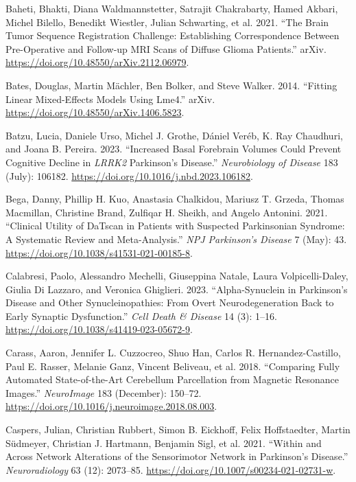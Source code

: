 \documentclass[
  table]{article}
\newlength{\cslhangindent}
\newenvironment{CSLReferences}[2] %
 {\begin{list}{}{%
  \setlength{\itemindent}{0pt}
  \setlength{\leftmargin}{0pt}
  \setlength{\parsep}{0pt}
  \ifodd #1
   \setlength{\leftmargin}{\cslhangindent}
   \setlength{\itemindent}{-1\cslhangindent}
  \fi
  \setlength{\itemsep}{#2\baselineskip}}}
 {\end{list}}
\begin{document}
\begin{CSLReferences}{1}{0}
Baheti, Bhakti, Diana Waldmannstetter, Satrajit Chakrabarty, Hamed
Akbari, Michel Bilello, Benedikt Wiestler, Julian Schwarting, et al.
2021. {``The {Brain} {Tumor} {Sequence} {Registration} {Challenge}:
{Establishing} {Correspondence} Between {Pre}-{Operative} and
{Follow}-up {MRI} Scans of Diffuse Glioma Patients.''} arXiv.
\url{https://doi.org/10.48550/arXiv.2112.06979}.

Bates, Douglas, Martin Mächler, Ben Bolker, and Steve Walker. 2014.
{``Fitting {Linear} {Mixed}-{Effects} {Models} Using Lme4.''} arXiv.
\url{https://doi.org/10.48550/arXiv.1406.5823}.

Batzu, Lucia, Daniele Urso, Michel J. Grothe, Dániel Veréb, K. Ray
Chaudhuri, and Joana B. Pereira. 2023. {``Increased Basal Forebrain
Volumes Could Prevent Cognitive Decline in \emph{LRRK2} {Parkinson}'s
Disease.''} \emph{Neurobiology of Disease} 183 (July): 106182.
\url{https://doi.org/10.1016/j.nbd.2023.106182}.

Bega, Danny, Phillip H. Kuo, Anastasia Chalkidou, Mariusz T. Grzeda,
Thomas Macmillan, Christine Brand, Zulfiqar H. Sheikh, and Angelo
Antonini. 2021. {``Clinical Utility of {DaTscan} in Patients with
Suspected {Parkinsonian} Syndrome: A Systematic Review and
Meta-Analysis.''} \emph{NPJ Parkinson's Disease} 7 (May): 43.
\url{https://doi.org/10.1038/s41531-021-00185-8}.

Calabresi, Paolo, Alessandro Mechelli, Giuseppina Natale, Laura
Volpicelli-Daley, Giulia Di Lazzaro, and Veronica Ghiglieri. 2023.
{``Alpha-Synuclein in {Parkinson}{'}s Disease and Other
Synucleinopathies: From Overt Neurodegeneration Back to Early Synaptic
Dysfunction.''} \emph{Cell Death \& Disease} 14 (3): 1--16.
\url{https://doi.org/10.1038/s41419-023-05672-9}.

Carass, Aaron, Jennifer L. Cuzzocreo, Shuo Han, Carlos R.
Hernandez-Castillo, Paul E. Rasser, Melanie Ganz, Vincent Beliveau, et
al. 2018. {``Comparing Fully Automated State-of-the-Art Cerebellum
Parcellation from Magnetic Resonance Images.''} \emph{NeuroImage} 183
(December): 150--72.
\url{https://doi.org/10.1016/j.neuroimage.2018.08.003}.

Caspers, Julian, Christian Rubbert, Simon B. Eickhoff, Felix
Hoffstaedter, Martin Südmeyer, Christian J. Hartmann, Benjamin Sigl, et
al. 2021. {``Within and Across Network Alterations of the Sensorimotor
Network in {Parkinson}'s Disease.''} \emph{Neuroradiology} 63 (12):
2073--85. \url{https://doi.org/10.1007/s00234-021-02731-w}.


\end{CSLReferences}
\end{document}
